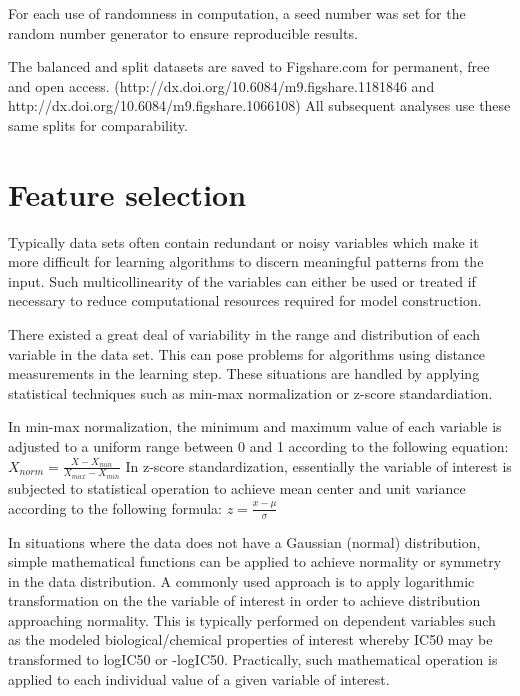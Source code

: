 For each use of randomness in computation, a seed number was set for the random number generator to ensure reproducible results.  

The balanced and split datasets are saved to Figshare.com for permanent, free and open access. (http://dx.doi.org/10.6084/m9.figshare.1181846 and http://dx.doi.org/10.6084/m9.figshare.1066108) All subsequent analyses use these same splits for comparability.

\section{Feature selection}

Typically data sets often contain redundant or noisy variables which make it more difficult for learning algorithms to discern meaningful patterns from the input. Such multicollinearity of the variables can either be used or treated if necessary to reduce computational resources required for model construction. \cite{Nantasenamat2009}

There existed a great deal of variability in the range and distribution of each variable in the data set. This can pose problems for algorithms using distance measurements in the learning step. These situations are handled by applying statistical techniques such as min-max normalization or z-score standardiation. 

In min-max normalization, the minimum and maximum value of each variable is adjusted to a uniform range between 0 and 1 according to the following equation: $ X_{norm} = \frac{X - X_{min}}{X_{max} - X_{min}}  $ In z-score standardization, essentially the variable of interest is subjected to statistical operation to achieve mean center and unit variance according to the following formula: $ z = \frac{x - \mu}{\sigma}  $ \cite{Nantasenamat2009}

In situations where the data does not have a Gaussian (normal) distribution, simple mathematical functions can be applied to achieve normality or symmetry in the data distribution. A commonly used approach is to apply logarithmic transformation on the the variable of interest in order to achieve distribution approaching normality. This is typically performed on dependent variables such as the modeled biological/chemical properties of interest whereby IC50 may be transformed to logIC50 or -logIC50. Practically, such mathematical operation is applied to each individual value of a given variable of interest. \cite{Nantasenamat2009}

